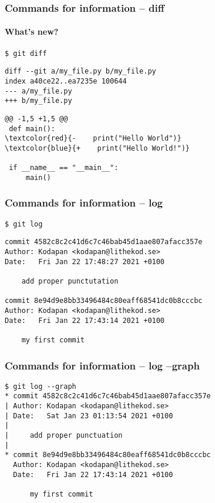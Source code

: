 \documentclass{beamer}
\begin{document}
\begin{frame}[fragile]
  \frametitle{Commands for information -- diff}
  \framesubtitle{What's new?}

\begin{verbatim}
$ git diff
\end{verbatim}
\pause{}
\vspace{-2.4ex}
{
\color{gray}
\begin{Verbatim}[commandchars=\\\{\}]
diff --git a/my_file.py b/my_file.py
index a40ce22..ea7235e 100644
--- a/my_file.py
+++ b/my_file.py
\end{Verbatim}
}
\pause{}
\begin{Verbatim}[commandchars=\\\{\}]
@@ -1,5 +1,5 @@
 def main():
\textcolor{red}{-    print("Hello World")}
\textcolor{blue}{+    print("Hello World!")}
 
 if __name__ == "__main__":
     main()
\end{Verbatim}
\end{frame}

\begin{frame}[fragile]
  \frametitle{Commands for information -- log}
\begin{Verbatim}
$ git log
\end{Verbatim}
\pause{}
\vspace{-1.2ex} %
\begin{Verbatim}
commit 4582c8c2c41d6c7c46bab45d1aae807afacc357e
Author: Kodapan <kodapan@lithekod.se>
Date:   Fri Jan 22 17:48:27 2021 +0100

    add proper punctutation

commit 8e94d9e8bb33496484c80eaff68541dc0b8cccbc
Author: Kodapan <kodapan@lithekod.se>
Date:   Fri Jan 22 17:43:14 2021 +0100

    my first commit
\end{Verbatim}
\end{frame}

\begin{frame}[fragile]
  \frametitle{Commands for information -- log --graph}
\begin{Verbatim}[commandchars=\\\{\}]
$ git log --graph
* commit 4582c8c2c41d6c7c46bab45d1aae807afacc357e
| Author: Kodapan <kodapan@lithekod.se>
| Date:   Sat Jan 23 01:13:54 2021 +0100
| 
|     add proper punctuation
| 
* commit 8e94d9e8bb33496484c80eaff68541dc0b8cccbc
  Author: Kodapan <kodapan@lithekod.se>
  Date:   Fri Jan 22 17:43:14 2021 +0100
  
      my first commit
\end{Verbatim}
\end{frame}
\end{document}

